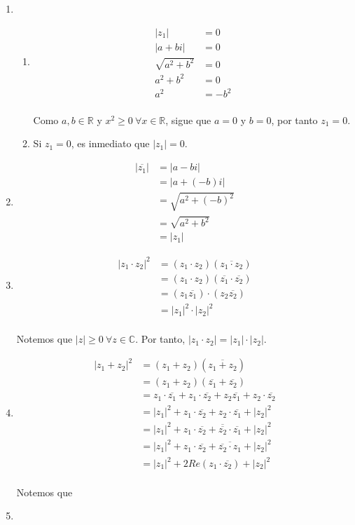 \documentclass[11pt]{article}
\newcommand{\R}{\mathbb{R}}
\newcommand{\C}{\mathbb{C}}
\begin{document}
\begin{enumerate}[label=\roman*)]
  \item \begin{enumerate}[label=\alph*)]
    \item \begin{align*}
      |z_1| &= 0\\
      |a+bi| &= 0\\
      \sqrt{a^2+b^2} &= 0 \\
      a^2+b^2 &= 0 \\
      a^2 &= -b^2 
    \end{align*}\\
    Como $a,b\in \R$ y $x^2\geq 0 \ \forall x\in \R$, sigue que $a=0$ y $b=0$, por tanto $z_1=0$.
    \item Si $z_1=0$, es inmediato que $|z_1|=0$.
  \end{enumerate}
  
  \item \begin{align*}
    |\overline{z_1}| &= |a-bi|\\
    &= |a+(-b)i| \\
    &= \sqrt{a^2+(-b)^2}\\
    &= \sqrt{a^2+b^2}\\
    &= |z_1|
  \end{align*}

  \item \begin{align*}
    |z_1 \cdot z_2|^2 &= (z_1 \cdot z_2) (\overline{z_1 \cdot z_2})\\
    &= (z_1 \cdot z_2) (\overline{z_1} \cdot \overline{z_2} )\\
    &= (z_1 \overline{z_1}) \cdot (z_2 \overline{z_2})\\
    &= |z_1|^2 \cdot |z_2|^2
  \end{align*}\\
  Notemos que $|z|\geq 0 \ \forall z\in \C$. Por tanto, $|z_1 \cdot z_2|=|z_1|\cdot |z_2|$.

  \item \begin{align*}
    |z_1+z_2|^2 &= (z_1+z_2) (\overline{z_1+z_2})\\
    &=  (z_1+z_2) (\overline{z_1} + \overline{z_2})\\
    &= z_1 \cdot \overline{z_1} + z_1\cdot \overline{z_2} + z_2 \overline{z_1} + z_2 \cdot \overline{z_2} \\
    &= |z_1|^2+ z_1\cdot \overline{z_2} + z_2 \cdot \overline{z_1} + |z_2|^2 \\
    &= |z_1|^2+ z_1\cdot \overline{z_2} + \overline{\overline{z_2}} \cdot \overline{z_1} + |z_2|^2 \\
    &= |z_1|^2+ z_1\cdot \overline{z_2} + \overline{\overline{z_2} \cdot z_1} + |z_2|^2 \\
    &= |z_1|^2+ 2 Re(z_1\cdot \overline{z_2}) + |z_2|^2
  \end{align*} \\
  Notemos que  

  \item 
\end{enumerate}
\end{document}
